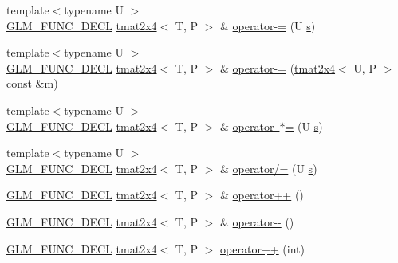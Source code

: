 \begin{DoxyCompactItemize}
\item 
{\footnotesize template$<$typename U $>$ }\\\mbox{\hyperlink{setup_8hpp_ab2d052de21a70539923e9bcbf6e83a51}{G\+L\+M\+\_\+\+F\+U\+N\+C\+\_\+\+D\+E\+CL}} \mbox{\hyperlink{structglm_1_1tmat2x4}{tmat2x4}}$<$ T, P $>$ \& \mbox{\hyperlink{structglm_1_1tmat2x4_a45b141f4b8af69b09a7acbdddc418247}{operator-\/=}} (U \mbox{\hyperlink{glad_8h_af1b1d5edfea6a34daee7389b1b5810ad}{s}})
\item 
{\footnotesize template$<$typename U $>$ }\\\mbox{\hyperlink{setup_8hpp_ab2d052de21a70539923e9bcbf6e83a51}{G\+L\+M\+\_\+\+F\+U\+N\+C\+\_\+\+D\+E\+CL}} \mbox{\hyperlink{structglm_1_1tmat2x4}{tmat2x4}}$<$ T, P $>$ \& \mbox{\hyperlink{structglm_1_1tmat2x4_ae58d059cf5f674054e6a82f3fde4dadd}{operator-\/=}} (\mbox{\hyperlink{structglm_1_1tmat2x4}{tmat2x4}}$<$ U, P $>$ const \&m)
\item 
{\footnotesize template$<$typename U $>$ }\\\mbox{\hyperlink{setup_8hpp_ab2d052de21a70539923e9bcbf6e83a51}{G\+L\+M\+\_\+\+F\+U\+N\+C\+\_\+\+D\+E\+CL}} \mbox{\hyperlink{structglm_1_1tmat2x4}{tmat2x4}}$<$ T, P $>$ \& \mbox{\hyperlink{structglm_1_1tmat2x4_ab8856a8e328a995c9f67550c69e7daf0}{operator $\ast$=}} (U \mbox{\hyperlink{glad_8h_af1b1d5edfea6a34daee7389b1b5810ad}{s}})
\item 
{\footnotesize template$<$typename U $>$ }\\\mbox{\hyperlink{setup_8hpp_ab2d052de21a70539923e9bcbf6e83a51}{G\+L\+M\+\_\+\+F\+U\+N\+C\+\_\+\+D\+E\+CL}} \mbox{\hyperlink{structglm_1_1tmat2x4}{tmat2x4}}$<$ T, P $>$ \& \mbox{\hyperlink{structglm_1_1tmat2x4_aa979764dc4e9915169cec5dd81b55b31}{operator/=}} (U \mbox{\hyperlink{glad_8h_af1b1d5edfea6a34daee7389b1b5810ad}{s}})
\item 
\mbox{\hyperlink{setup_8hpp_ab2d052de21a70539923e9bcbf6e83a51}{G\+L\+M\+\_\+\+F\+U\+N\+C\+\_\+\+D\+E\+CL}} \mbox{\hyperlink{structglm_1_1tmat2x4}{tmat2x4}}$<$ T, P $>$ \& \mbox{\hyperlink{structglm_1_1tmat2x4_a3cee5fba0b07ed5708aeea6b2d6fcf46}{operator++}} ()
\item 
\mbox{\hyperlink{setup_8hpp_ab2d052de21a70539923e9bcbf6e83a51}{G\+L\+M\+\_\+\+F\+U\+N\+C\+\_\+\+D\+E\+CL}} \mbox{\hyperlink{structglm_1_1tmat2x4}{tmat2x4}}$<$ T, P $>$ \& \mbox{\hyperlink{structglm_1_1tmat2x4_aafc4d25fe4f906a6e8ef4b7f90f7ff43}{operator-\/-\/}} ()
\item 
\mbox{\hyperlink{setup_8hpp_ab2d052de21a70539923e9bcbf6e83a51}{G\+L\+M\+\_\+\+F\+U\+N\+C\+\_\+\+D\+E\+CL}} \mbox{\hyperlink{structglm_1_1tmat2x4}{tmat2x4}}$<$ T, P $>$ \mbox{\hyperlink{structglm_1_1tmat2x4_a721945e0fb3653040ed9b68a65288a6c}{operator++}} (int)

\end{DoxyCompactItemize}
